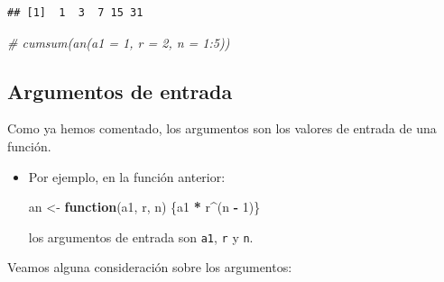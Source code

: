 \documentclass[]{book}
\newenvironment{Shaded}{\begin{snugshade}}{\end{snugshade}}
\newcommand{\CommentTok}[1]{\textcolor[rgb]{0.56,0.35,0.01}{\textit{#1}}}
\newcommand{\ControlFlowTok}[1]{\textcolor[rgb]{0.13,0.29,0.53}{\textbf{#1}}}
\newcommand{\DecValTok}[1]{\textcolor[rgb]{0.00,0.00,0.81}{#1}}
\newcommand{\NormalTok}[1]{#1}
\newcommand{\OperatorTok}[1]{\textcolor[rgb]{0.81,0.36,0.00}{\textbf{#1}}}
\newcommand{\StringTok}[1]{\textcolor[rgb]{0.31,0.60,0.02}{#1}}
\begin{document}
\begin{verbatim}
## [1]  1  3  7 15 31
\end{verbatim}

\begin{Shaded}
\begin{Highlighting}[]
\CommentTok{# cumsum(an(a1 = 1, r = 2, n = 1:5))}
\end{Highlighting}
\end{Shaded}

\hypertarget{argumentos-de-entrada}{%
\subsection{Argumentos de entrada}\label{argumentos-de-entrada}}

Como ya hemos comentado, los
argumentos son los valores de entrada de una función.

\begin{itemize}
\item
  Por ejemplo, en la función anterior:

\begin{Shaded}
\begin{Highlighting}[]
\NormalTok{an <-}\StringTok{ }\ControlFlowTok{function}\NormalTok{(a1, r, n) \{a1 }\OperatorTok{*}\StringTok{ }\NormalTok{r}\OperatorTok{^}\NormalTok{(n }\OperatorTok{-}\StringTok{ }\DecValTok{1}\NormalTok{)\}}
\end{Highlighting}
\end{Shaded}

  los argumentos de entrada son \texttt{a1}, \texttt{r} y \texttt{n}.
\end{itemize}

Veamos alguna consideración sobre los argumentos:
\end{document}
